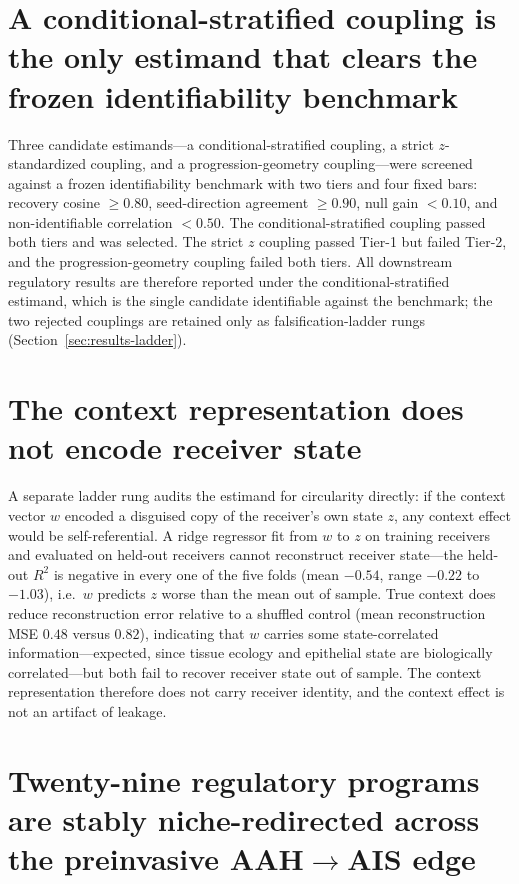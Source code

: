 \section{A conditional-stratified coupling is the only estimand that clears the frozen identifiability benchmark}
\label{sec:results-estimand}

Three candidate estimands---a conditional-stratified coupling, a strict $z$-standardized coupling, and a progression-geometry coupling---were screened against a frozen identifiability benchmark with two tiers and four fixed bars: recovery cosine $\geq 0.80$, seed-direction agreement $\geq 0.90$, null gain $< 0.10$, and non-identifiable correlation $< 0.50$. The conditional-stratified coupling passed both tiers and was selected. The strict $z$ coupling passed Tier-1 but failed Tier-2, and the progression-geometry coupling failed both tiers. All downstream regulatory results are therefore reported under the conditional-stratified estimand, which is the single candidate identifiable against the benchmark; the two rejected couplings are retained only as falsification-ladder rungs (Section~\ref{sec:results-ladder}).

\section{The context representation does not encode receiver state}
\label{sec:leakage}

A separate ladder rung audits the estimand for circularity directly: if the context vector $w$ encoded a disguised copy of the receiver's own state $z$, any context effect would be self-referential. A ridge regressor fit from $w$ to $z$ on training receivers and evaluated on held-out receivers cannot reconstruct receiver state---the held-out $R^2$ is negative in every one of the five folds (mean $-0.54$, range $-0.22$ to $-1.03$), i.e.\ $w$ predicts $z$ worse than the mean out of sample. True context does reduce reconstruction error relative to a shuffled control (mean reconstruction MSE $0.48$ versus $0.82$), indicating that $w$ carries some state-correlated information---expected, since tissue ecology and epithelial state are biologically correlated---but both fail to recover receiver state out of sample. The context representation therefore does not carry receiver identity, and the context effect is not an artifact of leakage.

\section{Twenty-nine regulatory programs are stably niche-redirected across the preinvasive AAH$\rightarrow$AIS edge}
\label{sec:stable}

